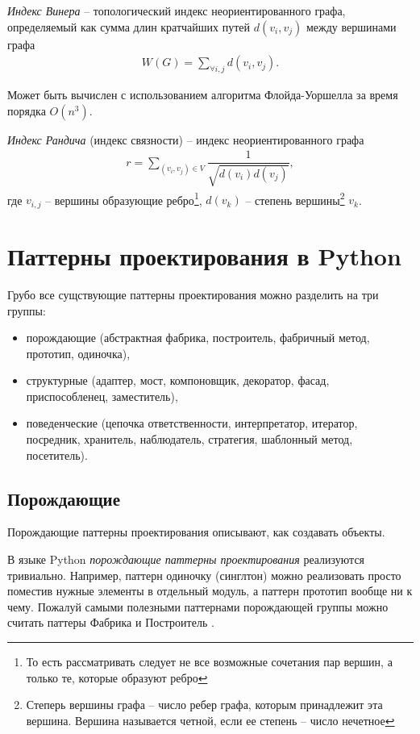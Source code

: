 \documentclass[%
	11pt,
	a4paper,
	utf8,
		]{article}
\begin{document}
\emph{Индекс Винера} -- топологический индекс неориентированного графа, определяемый как сумма длин кратчайших путей $ d(v_i, v_j) $ между вершинами графа
\begin{align*}
	W(G) = \sum_{\forall i, j} d(v_i, v_j).
\end{align*}

Может быть вычислен с использованием алгоритма Флойда-Уоршелла за время порядка $ O(n^3) $.

\emph{Индекс Рандича} (индекс связности) -- индекс неориентированного графа
\begin{align*}
	r = \sum_{(v_i, v_j) \in V} \dfrac{1}{ \sqrt{d(v_i)d(v_j)} },
\end{align*}
где $ v_{i, j} $ -- вершины образующие ребро\footnote{То есть рассматривать следует не все возможные сочетания пар вершин, а только те, которые образуют ребро}, $ d(v_k) $ -- степень вершины\footnote{Степерь вершины графа -- число ребер графа, которым принадлежит эта вершина. Вершина называется четной, если ее степень -- число нечетное} $ v_k $.

\section{Паттерны проектирования в Python}

Грубо все сущствующие паттерны проектирования можно разделить на три группы:
\begin{itemize}
	\item порождающие (абстрактная фабрика, построитель, фабричный метод, прототип, одиночка),
	
	\item структурные (адаптер, мост, компоновщик, декоратор, фасад, приспособленец, заместитель),
	
	\item поведенческие (цепочка ответственности, интерпретатор, итератор, посредник, хранитель, наблюдатель, стратегия, шаблонный метод, посетитель).
\end{itemize}

\subsection{Порождающие}

Порождающие паттерны проектирования описывают, как создавать объекты.

В языке Python \emph{порождающие паттерны проектирования} реализуются тривиально. Например, паттерн одиночку (синглтон) можно реализовать просто поместив нужные элементы в отдельный модуль, а паттерн прототип вообще ни к чему. Пожалуй самыми полезными паттернами порождающей группы можно считать паттеры Фабрика и Построитель \cite[]{summerfield:python_practice}. 
\end{document}
